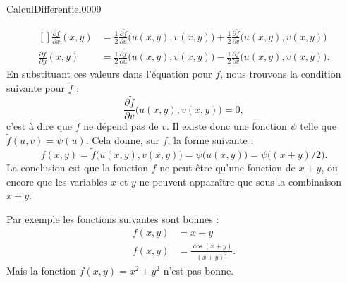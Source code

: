 \begin{corrige}{CalculDifferentiel0009}
\begin{description}
			\begin{equation}
				\begin{aligned}[]
					\frac{ \partial f }{ \partial x }(x,y)&=\frac{ 1 }{2}\frac{ \partial \tilde f }{ \partial u }\big( u(x,y),v(x,y) \big)+\frac{ 1 }{2}\frac{ \partial \tilde f }{ \partial v }\big( u(x,y),v(x,y) \big)\\
					\frac{ \partial f }{ \partial y }(x,y)&=\frac{ 1 }{2}\frac{ \partial \tilde f }{ \partial u }\big( u(x,y),v(x,y) \big)-\frac{ 1 }{2}\frac{ \partial \tilde f }{ \partial v }\big( u(x,y),v(x,y) \big).
				\end{aligned}
			\end{equation}
			En substituant ces valeurs dans l'équation pour $f$, nous trouvons la condition suivante pour $\tilde f$ :
			\begin{equation}
				\frac{ \partial \tilde f }{ \partial v }\big( u(x,y),v(x,y) \big)=0,
			\end{equation}
			c'est à dire que $\tilde f$ ne dépend pas de $v$. Il existe donc une fonction $\psi$ telle que $\tilde f(u,v)=\psi(u)$. Cela donne, sur $f$, la forme suivante :
			\begin{equation}
				f(x,y)=\tilde f\big( u(x,y),v(x,y) \big)=\psi\big( u(x,y) \big)=\psi\big( (x+y)/2 \big).
			\end{equation}
			La conclusion est que la fonction $f$ ne peut être qu'une fonction de $x+y$, ou encore que les variables $x$ et $y$ ne peuvent apparaître que sous la combinaison $x+y$.

			Par exemple les fonctions suivantes sont bonnes :
			\begin{subequations}
				\begin{align}
					f(x,y)&=x+y\\
					f(x,y)&=\frac{ \cos(x+y) }{ (x+y)^2 }.
				\end{align}
			\end{subequations}
			Mais la fonction $f(x,y)=x^2+y^2$ n'est pas bonne.
	\end{description}
	

\end{corrige}
